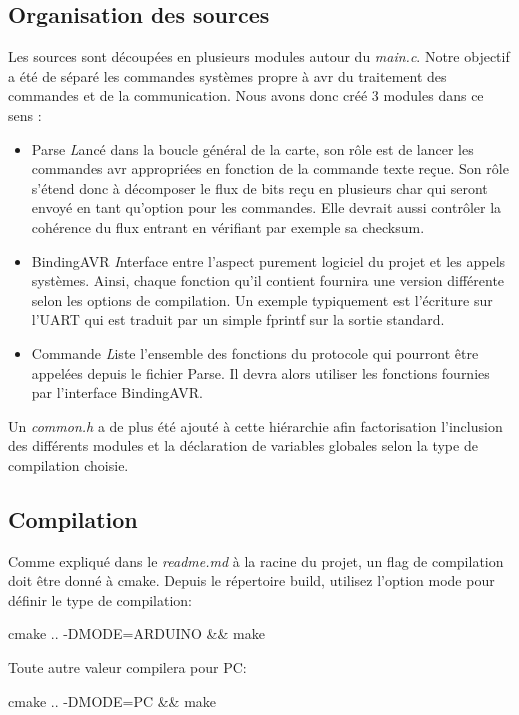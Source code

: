 \subsection{Organisation des sources}
Les sources sont découpées en plusieurs modules autour du \textit{main.c}. Notre
objectif a été de séparé les commandes systèmes propre à avr du traitement des commandes
et de la communication. Nous avons donc créé 3 modules dans ce sens :
\begin{itemize}
\item Parse 
  { 
    \textit 
    Lancé dans la boucle général de la carte, son rôle est de lancer
    les commandes avr appropriées en fonction de la commande texte reçue. Son rôle s'étend 
    donc à décomposer le flux de bits reçu en plusieurs char qui seront envoyé en tant 
    qu'option pour les commandes. Elle devrait aussi contrôler la cohérence du flux entrant
    en vérifiant par exemple sa checksum.
  }
\item BindingAVR
  {
    \textit
    Interface entre l'aspect purement logiciel du projet et les appels systèmes. Ainsi,
    chaque fonction qu'il contient fournira une version différente selon les options de 
    compilation. Un exemple typiquement est l'écriture sur l'UART qui est traduit par un 
    simple fprintf sur la sortie standard.
  }
\item Commande
  {
    \textit
    Liste l'ensemble des fonctions du protocole qui pourront être appelées depuis le fichier 
    Parse. Il devra alors utiliser les fonctions fournies par l'interface BindingAVR.
  }
\end{itemize}

Un \textit{common.h} a de plus été ajouté à cette hiérarchie afin factorisation l'inclusion des
différents modules et la déclaration de variables globales selon la type de compilation
choisie.\\


\subsection{Compilation}
Comme expliqué dans le \textit{readme.md} à la racine du projet, un flag de compilation doit
être donné à cmake. Depuis le répertoire build, utilisez l'option mode pour définir le type
de compilation:
\begin{center} cmake .. -DMODE=ARDUINO \&\& make\end{center}

Toute autre valeur compilera pour PC:
\begin{center} cmake .. -DMODE=PC \&\& make\end{center}
